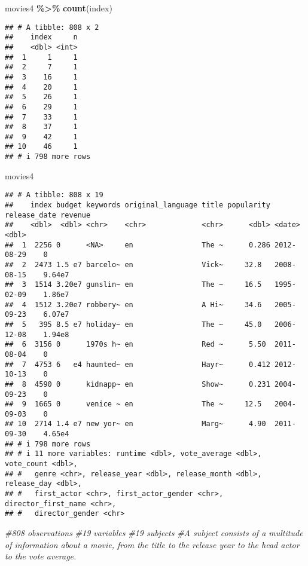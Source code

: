 \documentclass[
]{article}
\newenvironment{Shaded}{\begin{snugshade}}{\end{snugshade}}
\newcommand{\CommentTok}[1]{\textcolor[rgb]{0.56,0.35,0.01}{\textit{#1}}}
\newcommand{\FunctionTok}[1]{\textcolor[rgb]{0.13,0.29,0.53}{\textbf{#1}}}
\newcommand{\NormalTok}[1]{#1}
\newcommand{\SpecialCharTok}[1]{\textcolor[rgb]{0.81,0.36,0.00}{\textbf{#1}}}
\begin{document}
\begin{Shaded}
\begin{Highlighting}[]
\NormalTok{movies4 }\SpecialCharTok{\%\textgreater{}\%}
  \FunctionTok{count}\NormalTok{(index)}
\end{Highlighting}
\end{Shaded}

\begin{verbatim}
## # A tibble: 808 x 2
##    index     n
##    <dbl> <int>
##  1     1     1
##  2     7     1
##  3    16     1
##  4    20     1
##  5    26     1
##  6    29     1
##  7    33     1
##  8    37     1
##  9    42     1
## 10    46     1
## # i 798 more rows
\end{verbatim}

\begin{Shaded}
\begin{Highlighting}[]
\NormalTok{movies4}
\end{Highlighting}
\end{Shaded}

\begin{verbatim}
## # A tibble: 808 x 19
##    index budget keywords original_language title popularity release_date revenue
##    <dbl>  <dbl> <chr>    <chr>             <chr>      <dbl> <date>         <dbl>
##  1  2256 0      <NA>     en                The ~      0.286 2012-08-29    0     
##  2  2473 1.5 e7 barcelo~ en                Vick~     32.8   2008-08-15    9.64e7
##  3  1514 3.20e7 gunslin~ en                The ~     16.5   1995-02-09    1.86e7
##  4  1512 3.20e7 robbery~ en                A Hi~     34.6   2005-09-23    6.07e7
##  5   395 8.5 e7 holiday~ en                The ~     45.0   2006-12-08    1.94e8
##  6  3156 0      1970s h~ en                Red ~      5.50  2011-08-04    0     
##  7  4753 6   e4 haunted~ en                Hayr~      0.412 2012-10-13    0     
##  8  4590 0      kidnapp~ en                Show~      0.231 2004-09-23    0     
##  9  1665 0      venice ~ en                The ~     12.5   2004-09-03    0     
## 10  2714 1.4 e7 new yor~ en                Marg~      4.90  2011-09-30    4.65e4
## # i 798 more rows
## # i 11 more variables: runtime <dbl>, vote_average <dbl>, vote_count <dbl>,
## #   genre <chr>, release_year <dbl>, release_month <dbl>, release_day <dbl>,
## #   first_actor <chr>, first_actor_gender <chr>, director_first_name <chr>,
## #   director_gender <chr>
\end{verbatim}

\begin{Shaded}
\begin{Highlighting}[]
\CommentTok{\#808 observations}
\CommentTok{\#19 variables}
\CommentTok{\#19 subjects}
\CommentTok{\#A subject consists of a multitude of information about a movie, from the title to the release year to the head actor to the vote average.}
\end{Highlighting}
\end{Shaded}
\end{document}
